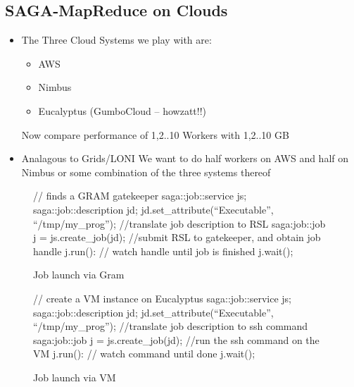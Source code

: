 \documentclass[conference,final]{IEEEtran}
\begin{document}
\subsection{SAGA-MapReduce on Clouds}

\begin{itemize}
\item  The Three Cloud Systems we play with are:
\begin{itemize}
\item AWS
\item Nimbus
\item Eucalyptus (GumboCloud -- howzatt!!)
\end{itemize}
Now compare performance of 1,2..10 Workers with 1,2..10 GB
\item Analagous to Grids/LONI We want to do half workers on AWS and half 
on Nimbus or some combination of the three systems thereof
\end{itemize}

\begin{figure}[!ht]
 \begin{center}
  \begin{mycode}[label=SAGA Job Launch via GRAM gatekeeper]
   {// finds a GRAM gatekeeper
    saga::job::service js;
    saga::job::description jd;
    jd.set_attribute(``Executable'', ``/tmp/my_prog'');
    //translate job description to RSL
    saga:job::job j = js.create_job(jd);
    //submit RSL to gatekeeper, and obtain job handle
    j.run():
    // watch handle until job is finished
    j.wait();
   } 
  \end{mycode}
  \caption{\label{gramjob}Job launch via Gram }
 \end{center}
\end{figure}


\begin{figure}[!ht]
 \begin{center}
  \begin{mycode}[label=SAGA create a VM instance on Eucalyptus]
   {// create a VM instance on Eucalyptus
    saga::job::service js;
    saga::job::description jd;
    jd.set_attribute(``Executable'', ``/tmp/my_prog'');
    //translate job description to ssh command
    saga:job::job j = js.create_job(jd);
    //run the ssh command on the VM
    j.run():
    // watch command until done
    j.wait();
   } 
  \end{mycode}
  \caption{\label{vmjob} Job launch via VM}
 \end{center}
\end{figure}
\end{document}
